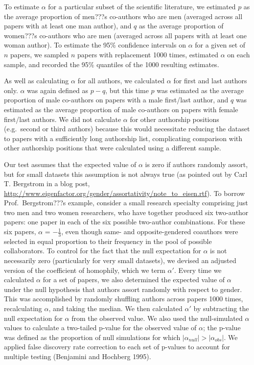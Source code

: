 \documentclass[12pt,]{article}
\begin{document}
To estimate \(\alpha\) for a particular subset of the scientific
literature, we estimated \(p\) as the average proportion of men???s
co-authors who are men (averaged across all papers with at least one man
author), and \(q\) as the average proportion of women???s co-authors who
are men (averaged across all papers with at least one woman author). To
estimate the 95\% confidence intervals on \(\alpha\) for a given set of
\(n\) papers, we sampled \(n\) papers with replacement 1000 times,
estimated \(\alpha\) on each sample, and recorded the 95\% quantiles of
the 1000 resulting estimates.

As well as calculating \(\alpha\) for all authors, we calculated
\(\alpha\) for first and last authors only. \(\alpha\) was again defined
as \(p - q\), but this time \(p\) was estimated as the average
proportion of male co-authors on papers with a male first/last author,
and \(q\) was estimated as the average proportion of male co-authors on
papers with female first/last authors. We did not calculate \(\alpha\)
for other authorship positions (e.g.~second or third authors) because
this would necessitate reducing the dataset to papers with a
sufficiently long authorship list, complicating comparison with other
authorship positions that were calculated using a different sample.

Our test assumes that the expected value of \(\alpha\) is zero if
authors randomly assort, but for small datasets this assumption is not
always true (as pointed out by Carl T. Bergstrom in a blog post,
\url{http://www.eigenfactor.org/gender/assortativity/note_to_eisen.rtf}).
To borrow Prof.~Bergstrom???s example, consider a small research
specialty comprising just two men and two women researchers, who have
together produced six two-author papers: one paper in each of the six
possible two-author combinations. For these six papers, \(\alpha\) =
\(-\frac{1}{3}\), even though same- and opposite-gendered coauthors were
selected in equal proportion to their frequency in the pool of possible
collaborators. To control for the fact that the null expectation for
\(\alpha\) is not necessarily zero (particularly for very small
datasets), we devised an adjusted version of the coefficient of
homophily, which we term \(\alpha'\). Every time we calculated
\(\alpha\) for a set of papers, we also determined the expected value of
\(\alpha\) under the null hypothesis that authors assort randomly with
respect to gender. This was accomplished by randomly shuffling authors
across papers 1000 times, recalculating \(\alpha\), and taking the
median. We then calculated \(\alpha'\) by subtracting the null
expectation for \(\alpha\) from the observed value. We also used the
null-simulated \(\alpha\) values to calculate a two-tailed p-value for
the observed value of \(\alpha\); the p-value was defined as the
proportion of null simulations for which
\(|\alpha_{null}| > |\alpha_{obs}|\). We applied false discovery rate
correction to each set of p-values to account for multiple testing
(Benjamini and Hochberg 1995).
\end{document}

